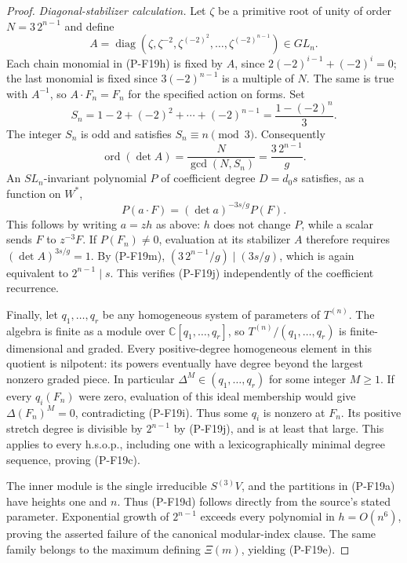 \begin{proof}
\emph{Diagonal-stabilizer calculation.}
Let $\zeta$ be a primitive root of unity of order $N=3\,2^{n-1}$
and define
\[
 A=\operatorname{diag}
  (\zeta,\zeta^{-2},\zeta^{(-2)^2},\ldots,
                         \zeta^{(-2)^{n-1}})\in GL_n.
\]
Each chain monomial in (P-F19h) is fixed by $A$, since
$2(-2)^{i-1}+(-2)^i=0$; the last monomial is fixed since
$3(-2)^{n-1}$ is a multiple of $N$. The same is true with
$A^{-1}$, so $A\cdot F_n=F_n$ for the specified action on forms.
Set
\[
 S_n=1-2+(-2)^2+\cdots+(-2)^{n-1}
     =\frac{1-(-2)^n}{3}.
\]
The integer $S_n$ is odd and satisfies $S_n\equiv n\pmod3$.
Consequently
\[
 \operatorname{ord}(\det A)
 =\frac{N}{\gcd(N,S_n)}
 =\frac{3\,2^{n-1}}{g}.
 \tag{P-F19m}
\]
An $SL_n$-invariant polynomial $P$ of coefficient degree
$D=d_0s$ satisfies, as a function on $W^*$,
\[
 P(a\cdot F)=(\det a)^{-3s/g}P(F).
 \tag{P-F19n}
\]
This follows by writing $a=zh$ as above: $h$ does not change
$P$, while a scalar sends $F$ to $z^{-3}F$.
If $P(F_n)\ne0$, evaluation at its stabilizer $A$ therefore
requires $(\det A)^{3s/g}=1$. By (P-F19m),
$(3\,2^{n-1}/g)\mid(3s/g)$, which is again equivalent to
$2^{n-1}\mid s$. This verifies (P-F19j) independently of
the coefficient recurrence.

Finally, let $q_1,\ldots,q_r$ be any homogeneous system of
parameters of $T^{(n)}$. The algebra is finite as a module over
$\mathbb C[q_1,\ldots,q_r]$, so
$T^{(n)}/(q_1,\ldots,q_r)$ is finite-dimensional and graded.
Every positive-degree homogeneous element in this quotient is
nilpotent: its powers eventually have degree beyond the largest
nonzero graded piece. In particular
$\Delta^M\in(q_1,\ldots,q_r)$ for some integer $M\ge1$.
If every $q_i(F_n)$ were zero, evaluation of this ideal membership
would give $\Delta(F_n)^M=0$, contradicting (P-F19i).
Thus some $q_i$ is nonzero at $F_n$. Its positive stretch degree
is divisible by $2^{n-1}$ by (P-F19j), and is at least that
large. This applies to every h.s.o.p., including one with a
lexicographically minimal degree sequence, proving (P-F19c).

The inner module is the single irreducible $S^{(3)}V$, and
the partitions in (P-F19a) have heights one and $n$.
Thus (P-F19d) follows directly from the source's stated
parameter. Exponential growth of $2^{n-1}$ exceeds every
polynomial in $h=O(n^6)$, proving the asserted failure of the
canonical modular-index clause. The same family belongs to the
maximum defining $\Xi(m)$, yielding (P-F19e).
\end{proof}

